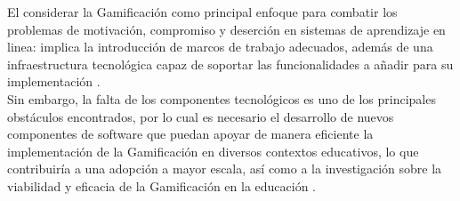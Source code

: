     
    
    
\noindent El considerar la Gamificación como principal enfoque para combatir los problemas de motivación, compromiso y deserción en sistemas de aprendizaje en linea: implica la introducción de marcos de trabajo adecuados, además de una infraestructura tecnológica capaz de soportar las funcionalidades a añadir para su implementación \cite{mappingStudy}.\\
    
\noindent Sin embargo, la falta de los componentes tecnológicos es uno de los principales obstáculos encontrados, por lo cual es necesario el desarrollo de nuevos componentes de software que puedan apoyar de manera eficiente la implementación de la Gamificación en diversos contextos educativos, lo que contribuiría a una adopción a mayor escala, así como a la investigación sobre la viabilidad y eficacia de la Gamificación en la educación \cite{mappingStudy}.\\
    
